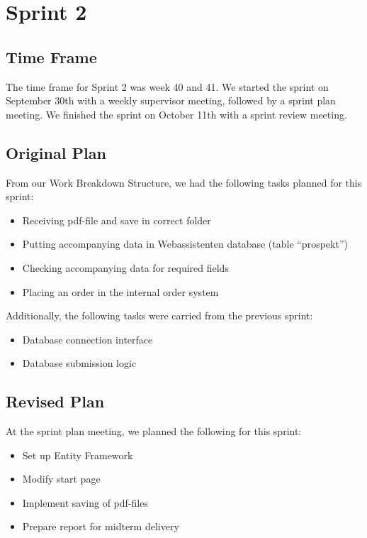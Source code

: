 \chapter{Sprint 2}

\section{Time Frame}
The time frame for Sprint 2 was week 40 and 41. We started the sprint on September 30th with a weekly supervisor meeting, followed by a sprint plan meeting. We finished the sprint on October 11th with a sprint review meeting.

\section{Original Plan}
From our Work Breakdown Structure, we had the following tasks planned for this sprint:
\begin{itemize}
	\item Receiving pdf-file and save in correct folder
	\item Putting accompanying data in Webassistenten database (table “prospekt”)
	\item Checking accompanying data for required fields
	\item Placing an order in the internal order system
\end{itemize}

Additionally, the following tasks were carried from the previous sprint:
\begin{itemize}
	\item Database connection interface
	\item Database submission logic
\end{itemize}

\section{Revised Plan}
At the sprint plan meeting, we planned the following for this sprint:
\begin{itemize}
	\item Set up Entity Framework
	\item Modify start page
	\item Implement saving of pdf-files
	\item Prepare report for midterm delivery
\end{itemize}

